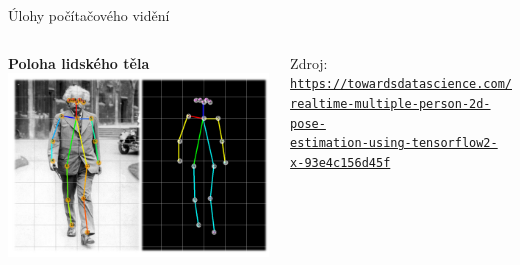 \documentclass[handout,aspectratio=169,dvipsnames]{beamer}
\begin{document}
\begin{frame}{Úlohy počítačového vidění}
{\begin{columns}[t]
        \centering \textbf{Poloha lidského těla} \\[1ex]
        \includegraphics[width=.98\textwidth]{img/pose_detection.png} \\

        \begin{minipage}{\textwidth}
        \tiny Zdroj: \href{https://towardsdatascience.com/realtime-multiple-person-2d-pose-estimation-using-tensorflow2-x-93e4c156d45f}{\tt https://towardsdatascience.com/\\ realtime-multiple-person-2d-pose- \\ estimation-using-tensorflow2- \\ x-93e4c156d45f}
        \end{minipage}

    \end{columns}}


\end{frame}

\end{document}
